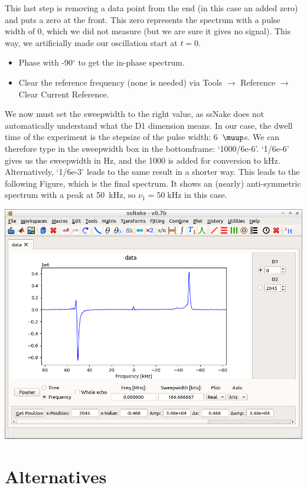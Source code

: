 \documentclass[11pt,a4paper]{article}
\begin{document}
This last step is removing a data point from the end (in this case an added zero) and puts a zero at the front. This zero represents the spectrum with a pulse width of 0, which we did not measure (but we are sure it gives no signal). This way, we artificially made our oscillation start at $t=0$. 

\begin{itemize}
\item Phase with -90$^\circ$ to get the in-phase spectrum.
\item Clear the reference frequency (none is needed) via Tools $\longrightarrow$ Reference $\longrightarrow$ Clear Current Reference.
\end{itemize}
We now must set the sweepwidth to the right value, as ssNake does not automatically understand what the D1 dimension means. In our case, the dwell time of the experiment is the stepsize of the pulse width: 6~$\muup$s. We can therefore type in the sweepwidth box in the bottomframe: `1000/6e-6'. `1/6e-6' gives us the sweepwidth in Hz, and the 1000 is added for conversion to kHz. Alternatively, `1/6e-3' leads to the same result in a shorter way. This leads to the following Figure, which is the final spectrum. It shows an (nearly) anti-symmetric spectrum with a peak at 50~kHz, so $\nu_1 = 50\;$kHz in this case.
\begin{center}
\includegraphics[width=0.8\linewidth]{Figs/Fig4.png}
\end{center}

\section{Alternatives}
\end{document}
